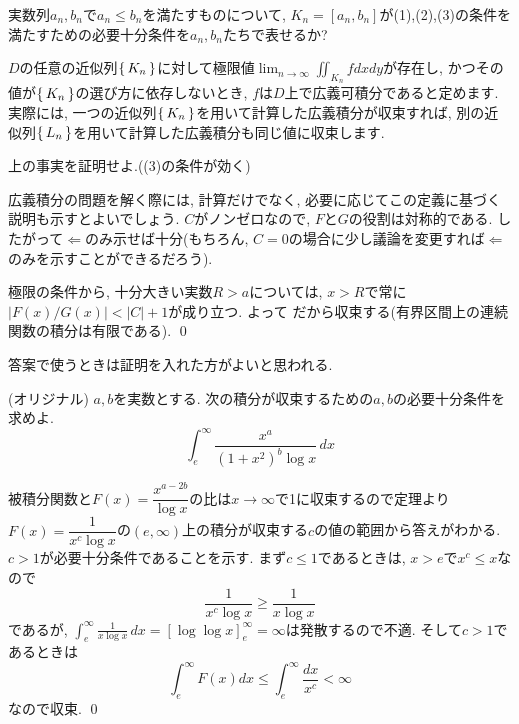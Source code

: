 \begin{prac}
実数列$a_n,b_n$で$a_n\leq b_n$を満たすものについて, $K_n = [a_n,b_n]$が(1),(2),(3)の条件を満たすための必要十分条件を$a_n,b_n$たちで表せるか?
\end{prac}
$D$の任意の近似列$\set{K_n}$に対して極限値$\lim_{n\to \infty}\iint_{K_n} fdxdy$が存在し, かつその値が$\set{K_n}$の選び方に依存しないとき, $f$は$D$上で広義可積分であると定めます. 実際には, 一つの近似列$\set{K_n}$を用いて計算した広義積分が収束すれば, 別の近似列$\set{L_n}$を用いて計算した広義積分も同じ値に収束します.
\begin{prac}
上の事実を証明せよ.((3)の条件が効く)
\end{prac}
広義積分の問題を解く際には, 計算だけでなく, 必要に応じてこの定義に基づく説明も示すとよいでしょう.
\prf $C$がノンゼロなので, $F$と$G$の役割は対称的である. したがって$\Leftarrow$のみ示せば十分(もちろん, $C=0$の場合に少し議論を変更すれば$\Leftarrow$のみを示すことができるだろう). \par
極限の条件から, 十分大きい実数$R>a$については, $x>R$で常に$|F(x)/G(x)| < |C|+1$が成り立つ.
よって
だから収束する(有界区間上の連続関数の積分は有限である). \qed
\begin{rem}
答案で使うときは証明を入れた方がよいと思われる.
\end{rem}
\begin{egprob} (オリジナル) $a,b$を実数とする. 次の積分が収束するための$a,b$の必要十分条件を求めよ.
\[
\int_{e}^{\infty} \dfrac{x^a}{(1+x^2)^{b}\log{x}}\, dx
\]
\end{egprob}
\begin{egans}
被積分関数と$F(x) = \dfrac{x^{a-2b}}{\log{x}}$の比は$x\to \infty$で1に収束するので定理より$F(x) = \dfrac{1}{x^{c} \log{x}}$の$(e,\infty)$上の積分が収束する$c$の値の範囲から答えがわかる. $c>1$が必要十分条件であることを示す. まず$c\leq 1$であるときは, $x>e$で$x^c\leq x$なので
\[\dfrac{1}{x^c\log{x}} \geq \dfrac{1}{x\log{x}} \]
であるが, $\int_{e}^{\infty} \frac{1}{x\log{x}}\, dx = [\log{\log{x}}]_{e}^{\infty} = \infty$は発散するので不適. そして$c>1$であるときは
\[\int_{e}^{\infty}F(x)dx \leq \int_{e}^{\infty}\dfrac{dx}{x^c} < \infty \]
なので収束. \qed
\end{egans}




